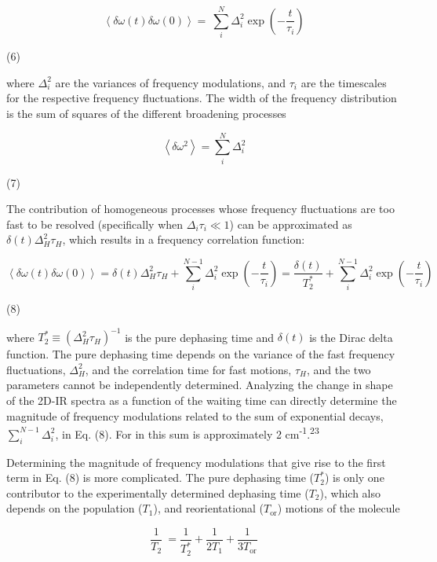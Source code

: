 \documentclass[]{article}
\begin{document}
\[\left\langle \delta\omega(t) \delta\omega(0) \right\rangle = \ \sum_{i}^{N}{\Delta_{i}^{2}\exp\left( - \frac{t}{\tau_{i}} \right)}\]

(6)

where \(\Delta_{i}^{2}\) are the variances of frequency modulations, and \(\tau_{i}\) are the timescales for the respective frequency fluctuations. The width of the frequency distribution is the sum of squares of the different broadening processes

\[\left\langle \delta\omega^{2} \right\rangle = \sum_{i}^{N}\Delta_{i}^{2}\]

(7)

The contribution of homogeneous processes whose frequency fluctuations are too fast to be resolved (specifically when \(\Delta_{i}\tau_{i} \ll 1\)) can be approximated as \(\delta\left( t \right)\Delta_{H}^{2}\tau_{H}\), which results in a frequency correlation function:

\[\left\langle \delta\omega(t) \delta\omega(0) \right\rangle = \delta\left( t \right)\Delta_{H}^{2}\tau_{H} + \sum_{i}^{N - 1}{\Delta_{i}^{2}\exp\left( - \frac{t}{\tau_{i}} \right)} = \frac{\delta\left( t \right)}{T_{2}^{*}} + \sum_{i}^{N - 1}{\Delta_{i}^{2}\exp\left( - \frac{t}{\tau_{i}} \right)}\]

(8)

where \(T_{2}^{*} \equiv \left( \Delta_{H}^{2}\tau_{H} \right)^{- 1}\) is the pure dephasing time and \(\delta\left( t \right)\) is the Dirac delta function. The pure dephasing time depends on the variance of the fast frequency fluctuations, \(\Delta_{H}^{2}\), and the correlation time for fast motions, \(\tau_{H}\), and the two parameters cannot be independently determined. Analyzing the change in shape of the 2D-IR spectra as a function of the waiting time can directly determine the magnitude of frequency modulations related to the sum of exponential decays, \(\sum_{i}^{N - 1}\Delta_{i}^{2}\), in Eq. (8). For  in \ce{[C4C1im][PF6]} this sum is approximately 2 cm\textsuperscript{-1}.\textsuperscript{23}

Determining the magnitude of frequency modulations that give rise to the first term in Eq. (8) is more complicated. The pure dephasing time (\(T_{2}^{*}\)) is only one contributor to the experimentally determined dephasing time (\(T_{2}\)), which also depends on the population (\(T_{1}\)), and reorientational (\(T_{\text{or}}\)) motions of the molecule

\[\frac{1}{T_{2}}\  = \frac{1}{T_{2}^{*}} + \frac{1}{2T_{1}} + \frac{1}{3T_{\text{or}}}\]
\end{document}
